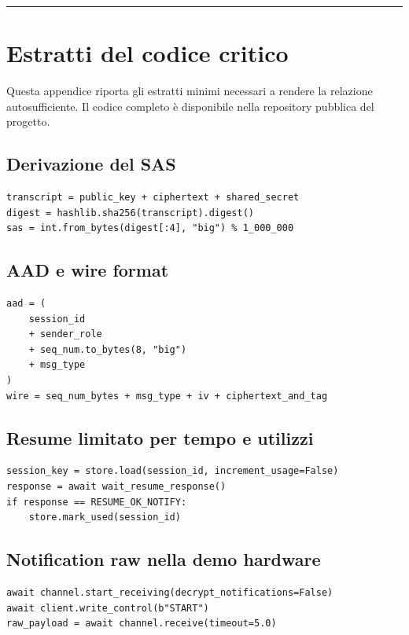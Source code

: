 \documentclass[11pt,a4paper]{article}
\begin{document}
\begin{center}\rule{0.5\linewidth}{0.5pt}\end{center}

\appendix
\section{Estratti del codice critico}

Questa appendice riporta gli estratti minimi necessari a rendere la
relazione autosufficiente. Il codice completo è disponibile nella
repository pubblica del progetto.

\subsection{Derivazione del SAS}
\begin{lstlisting}[style=pythonstyle]
transcript = public_key + ciphertext + shared_secret
digest = hashlib.sha256(transcript).digest()
sas = int.from_bytes(digest[:4], "big") % 1_000_000
\end{lstlisting}

\subsection{AAD e wire format}
\begin{lstlisting}[style=pythonstyle]
aad = (
    session_id
    + sender_role
    + seq_num.to_bytes(8, "big")
    + msg_type
)
wire = seq_num_bytes + msg_type + iv + ciphertext_and_tag
\end{lstlisting}

\subsection{Resume limitato per tempo e utilizzi}
\begin{lstlisting}[style=pythonstyle]
session_key = store.load(session_id, increment_usage=False)
response = await wait_resume_response()
if response == RESUME_OK_NOTIFY:
    store.mark_used(session_id)
\end{lstlisting}

\subsection{Notification raw nella demo hardware}
\begin{lstlisting}[style=pythonstyle]
await channel.start_receiving(decrypt_notifications=False)
await client.write_control(b"START")
raw_payload = await channel.receive(timeout=5.0)
\end{lstlisting}
\end{document}
